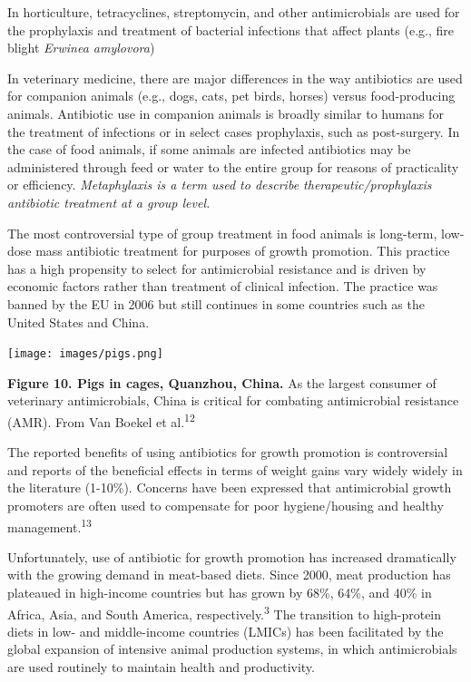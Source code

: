 \documentclass[
]{book}
\begin{document}
In horticulture, tetracyclines, streptomycin, and other antimicrobials are used for the prophylaxis and treatment of bacterial infections that affect plants (e.g., fire blight \emph{Erwinea amylovora})

In veterinary medicine, there are major differences in the way antibiotics are used for companion animals (e.g., dogs, cats, pet birds, horses) versus food-producing animals. Antibiotic use in companion animals is broadly similar to humans for the treatment of infections or in select cases prophylaxis, such as post-surgery. In the case of food animals, if some animals are infected antibiotics may be administered through feed or water to the entire group for reasons of practicality or efficiency. \emph{Metaphylaxis is a term used to describe therapeutic/prophylaxis antibiotic treatment at a group level.}

The most controversial type of group treatment in food animals is long-term, low-dose mass antibiotic treatment for purposes of growth promotion. This practice has a high propensity to select for antimicrobial resistance and is driven by economic factors rather than treatment of clinical infection. The practice was banned by the EU in 2006 but still continues in some countries such as the United States and China.

\texttt{[image: images/pigs.png]}

\textbf{Figure 10. Pigs in cages, Quanzhou, China.} As the largest consumer of veterinary antimicrobials, China is critical for combating antimicrobial resistance (AMR). From Van Boekel et al.\textsuperscript{12}

The reported benefits of using antibiotics for growth promotion is controversial and reports of the beneficial effects in terms of weight gains vary widely widely in the literature (1-10\%). Concerns have been expressed that antimicrobial growth promoters are often used to compensate for poor hygiene/housing and healthy management.\textsuperscript{13}

Unfortunately, use of antibiotic for growth promotion has increased dramatically with the growing demand in meat-based diets. Since 2000, meat production has plateaued in high-income countries but has grown by 68\%, 64\%, and 40\% in Africa, Asia, and South America, respectively.\textsuperscript{3} The transition to high-protein diets in low- and middle-income countries (LMICs) has been facilitated by the global expansion of intensive animal production systems, in which antimicrobials are used routinely to maintain health and productivity.
\end{document}
